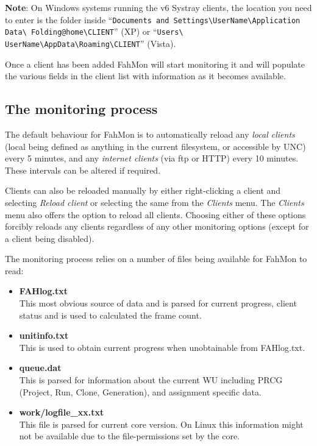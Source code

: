 \textbf{Note}: On Windows systems running the v6 Systray clients, the location
you need to enter is the folder inside ``\texttt{Documents and
Settings\textbackslash UserName\textbackslash Application Data\textbackslash
Folding@home\textbackslash CLIENT}'' (XP) or ``\texttt{Users\textbackslash
UserName\textbackslash AppData\textbackslash Roaming\textbackslash CLIENT}''
(Vista).

Once a client has been added FahMon will start monitoring it and will populate
the various fields in the client list with information as it becomes available.

\subsection{The monitoring process}

The default behaviour for FahMon is to automatically reload any \textit{local
clients} (local being defined as anything in the current filesystem, or
accessible by UNC) every 5 minutes, and any \textit{internet clients} (via ftp
or HTTP) every 10 minutes. These intervals can be altered if required.

Clients can also be reloaded manually by either right-clicking a client and
selecting \textit{Reload client} or selecting the same from the \textit{Clients}
menu. The \textit{Clients} menu also offers the option to reload all clients.
Choosing either of these options forcibly reloads any clients regardless of any
other monitoring options (except for a client being disabled).

The monitoring process relies on a number of files being available for FahMon to
read:
\begin{itemize}
 \item \textbf{FAHlog.txt}
  \\This most obvious source of data and is parsed for current progress, client
status and is used to calculated the frame count.
 \item \textbf{unitinfo.txt}
  \\This is used to obtain current progress when unobtainable from FAHlog.txt.
 \item \textbf{queue.dat}
  \\This is parsed for information about the current WU including PRCG (Project,
Run, Clone, Generation), and assignment specific data.
 \item \textbf{work/logfile\_xx.txt}
  \\This file is parsed for current core version. On Linux this information
might not be available due to the file-permissions set by the core.
\end{itemize}


